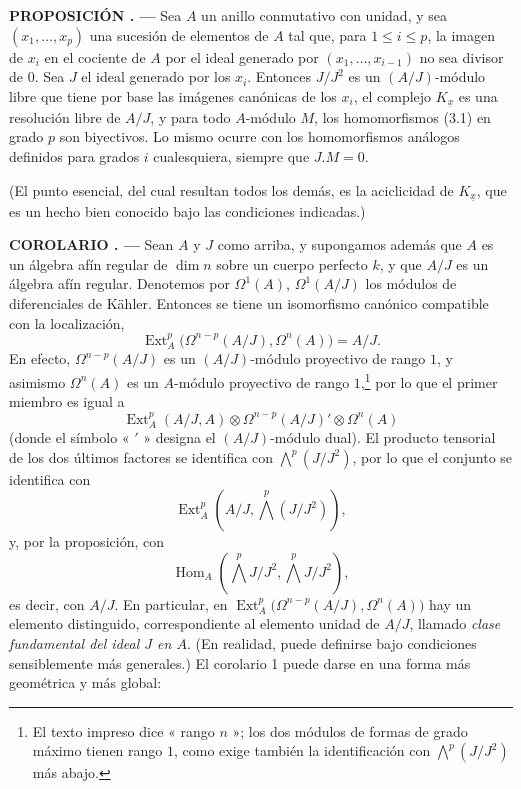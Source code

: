 \documentclass[11pt,twoside,openany]{book}
\numberwithin{equation}{section}
\newcommand{\src}[1]{%
  \phantomsection\hypertarget{src:#1}{}%
  \marginpar{\raggedleft\footnotesize\sffamily #1}%
}
\theoremstyle{plain}
\theoremstyle{definition}
\theoremstyle{remark}
\newcommand{\result}[2]{%
  \par\medskip\noindent\textbf{#1%
  \if\relax\detokenize{#2}\relax\else\space#2\fi. ---}\enspace
}
\newcommand{\FgaUnitKey}{frontmatter}
\renewcommand{\src}[1]{%
  \phantomsection\hypertarget{src:\FgaUnitKey:#1}{}%
  \marginpar{\raggedleft\footnotesize\sffamily #1}%
}
\theoremstyle{plain}
\theoremstyle{definition}
\theoremstyle{remark}
\begin{document}
\src{175}
\result{PROPOSICIÓN}{4} Sea $A$ un anillo conmutativo con unidad, y sea
$(x_1,\ldots,x_p)$ una sucesión de elementos de $A$ tal que, para $1\leq i\leq p$,
la imagen de $x_i$ en el cociente de $A$ por el ideal generado por
$(x_1,\ldots,x_{i-1})$ no sea divisor de $0$. Sea $J$ el ideal generado
por los $x_i$. Entonces $J/J^{2}$ es un $(A/J)$-módulo libre que tiene por base las
imágenes canónicas de los $x_i$, el complejo $K_{\underline{x}}$ es una resolución
libre de $A/J$, y para todo $A$-módulo $M$, los homomorfismos (3.1) en
grado $p$ son biyectivos. Lo mismo ocurre con los homomorfismos análogos
definidos para grados $i$ cualesquiera, siempre que $J.M=0$.

(El punto esencial, del cual resultan todos los demás, es la aciclicidad de
$K_{\underline{x}}$, que es un hecho bien conocido bajo las condiciones indicadas.)

\result{COROLARIO}{1} Sean $A$ y $J$ como arriba, y supongamos además que
$A$ es un álgebra afín regular de $\dim n$ sobre un cuerpo perfecto $k$, y
que $A/J$ es un álgebra afín regular. Denotemos por $\Omega^{1}(A)$,
$\Omega^{1}(A/J)$ los módulos de diferenciales de Kähler. Entonces se tiene un
isomorfismo canónico compatible con la localización,
\begin{equation}\tag{3.5}
  \operatorname{Ext}_{A}^{p}\bigl(\Omega^{n-p}(A/J),\Omega^{n}(A)\bigr)=A/J.
\end{equation}
En efecto, $\Omega^{n-p}(A/J)$ es un $(A/J)$-módulo proyectivo de rango $1$, y asimismo
$\Omega^{n}(A)$ es un $A$-módulo proyectivo de rango $1$,\footnote{El texto impreso
dice « rango $n$ »; los dos módulos de formas de grado máximo tienen rango
$1$, como exige también la identificación con $\bigwedge^{p}(J/J^{2})$ más abajo.}
por lo que el primer miembro es igual a
\[
  \operatorname{Ext}_{A}^{p}(A/J,A)
  \otimes\Omega^{n-p}(A/J)'\otimes\Omega^{n}(A)
\]
(donde el símbolo « $'$ » designa el $(A/J)$-módulo dual). El producto tensorial de los
dos últimos factores se identifica con $\bigwedge^{p}(J/J^{2})$, por lo que el conjunto
se identifica con
\[
  \operatorname{Ext}_{A}^{p}\!\left(A/J,\bigwedge^{p}(J/J^{2})\right),
\]
y, por la proposición, con
\[
  \operatorname{Hom}_{A}\!\left(\bigwedge^{p}J/J^{2},
  \bigwedge^{p}J/J^{2}\right),
\]
es decir, con $A/J$. En particular, en
$\operatorname{Ext}_{A}^{p}\bigl(\Omega^{n-p}(A/J),\Omega^{n}(A)\bigr)$ hay un
elemento distinguido, correspondiente al elemento unidad de $A/J$, llamado
\emph{clase fundamental del ideal $J$ en $A$}. (En realidad, puede
definirse bajo condiciones sensiblemente más generales.) El
corolario 1 puede darse en una forma más geométrica y más global:
\end{document}
